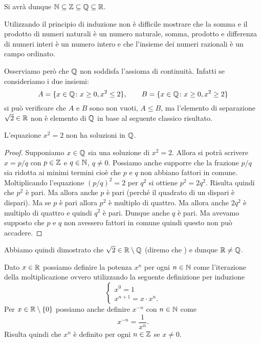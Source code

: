 Si avrà dunque $\mathbb N \subseteq \mathbb Z \subseteq \mathbb Q \subseteq \mathbb R$.

Utilizzando il principio di induzione non è difficile mostrare che
la somma e il prodotto di numeri naturali è un numero naturale,
somma, prodotto e differenza
di numeri interi è un numero intero e che l'insieme dei numeri
razionali è un campo ordinato.

Osserviamo però che $\mathbb Q$ non soddisfa l'assioma di continuità.
Infatti se consideriamo i due insiemi:
\[
 A = \{x\in \mathbb Q \colon x\ge 0, x^2 \le 2\},\qquad
 B = \{x\in \mathbb Q \colon x\ge 0, x^2 \ge 2\}
\]
si può verificare che $A$ e $B$ sono non vuoti, $A \le B$, ma l'elemento
di separazione $\sqrt{2}\in \mathbb R$ non è elemento di $\mathbb Q$ in base al seguente
classico risultato.

\begin{theorem}[Pitagora]
\mymark{**}
L'equazione $x^2=2$ non ha soluzioni in $\mathbb Q$.
\end{theorem}
%
\begin{proof}
\mymark{*}
Supponiamo $x\in \mathbb Q$ sia una soluzione di $x^2=2$.
Allora si potrà scrivere $x=p/q$ con $p\in \mathbb Z$ e $q\in \mathbb N$, $q\neq 0$.
Possiamo anche supporre che la frazione $p/q$ sia ridotta ai minimi
termini cioè che $p$ e $q$ non abbiano fattori in comune.
Moltiplicando l'equazione
$(p/q)^2=2$ per $q^2$ si ottiene $p^2 = 2 q^2$.
Risulta quindi che $p^2$ è pari.
Ma allora anche $p$ è pari (perché il quadrato di un dispari è dispari).
Ma se $p$ è pari allora $p^2$ è multiplo di quattro.
Ma allora anche $2q^2$ è multiplo di quattro e quindi $q^2$ è pari.
Dunque anche $q$ è pari. Ma avevamo supposto che $p$ e $q$ non avessero
fattori in comune quindi questo non può accadere.
\end{proof}

Abbiamo quindi dimostrato che $\sqrt{2} \in \mathbb R \setminus \mathbb Q$
(diremo che )
%
%
e dunque $\mathbb R \neq \mathbb Q$.

\begin{definition}
Dato $x \in \mathbb R$ possiamo definire la potenza $x^n$ per ogni
$n\in \mathbb N$ come l'iterazione della moltiplicazione
ovvero utilizzando
la seguente definizione per induzione
\[
\begin{cases}
  x^0 = 1\\
  x^{n+1} = x\cdot x^n.
\end{cases}
\]
Per $x\in \mathbb R\setminus\{0\}$ possiamo anche definire $x^{-n}$ con $n\in \mathbb N$
come
\[
x^{-n} = \frac{1}{x^n}.
\]
Risulta quindi che $x^n$ è definito per ogni $n\in \mathbb Z$ se $x\neq 0$.
\end{definition}

